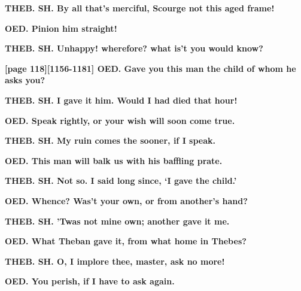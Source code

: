 \documentclass[11pt,letter]{book}
\begin{document}
\par \textbf{THEB. SH. By all that’s merciful, Scourge not this aged frame!}
\par 

\par \textbf{OED. Pinion him straight!}
\par 

\par \textbf{THEB. SH. Unhappy! wherefore? what is’t you would know?}
\par 

\par \textbf{[page 118][1156-1181] OED. Gave you this man the child of whom he asks you?}
\par 

\par \textbf{THEB. SH. I gave it him. Would I had died that hour!}
\par 

\par \textbf{OED. Speak rightly, or your wish will soon come true.}
\par 

\par \textbf{THEB. SH. My ruin comes the sooner, if I speak.}
\par 

\par \textbf{OED. This man will balk us with his baffling prate.}
\par 

\par \textbf{THEB. SH. Not so. I said long since, ‘I gave the child.’}
\par 

\par \textbf{OED. Whence? Was’t your own, or from another’s hand?}
\par 

\par \textbf{THEB. SH. ’Twas not mine own; another gave it me.}
\par 

\par \textbf{OED. What Theban gave it, from what home in Thebes?}
\par 

\par \textbf{THEB. SH. O, I implore thee, master, ask no more!}
\par 

\par \textbf{OED. You perish, if I have to ask again.}
\par 
\end{document}
